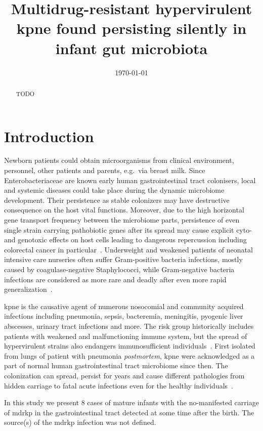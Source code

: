 \documentclass[12pt,a4paper]{article}
\title{Multidrug-resistant hypervirulent \Gls{kpne} found persisting silently in infant gut microbiota}
\date{\today}
\begin{document}
\maketitle
\glsresetall

\begin{abstract}
TODO
\end{abstract}

\section{Introduction}\label{sec:intro}
Newborn patients could obtain microorganisms from clinical environment, personnel, other patients and parents,
e.g.\ via breast milk.
Since Enterobacteriaceae are known early human gastrointestinal tract colonisers, local and systemic diseases could take
place during the dynamic microbiome development.
Their persistence as stable colonizers may have destructive consequence on the host vital functions.
Moreover, due to the high horizontal gene transport frequency between the microbiome parts, persistence of even single
strain carrying pathobiotic genes after its spread may cause explicit cyto- and genotoxic effects on host cells
leading to dangerous repercussion including colorectal cancer in particular~\cite{Pope2019}.
Underweight and weakened patients of neonatal intensive care nurseries often suffer Gram-positive bacteria infections,
mostly caused by coagulase-negative Staphylococci, while Gram-negative bacteria infections are considered as more rare
and deadly after even more rapid generalization~\cite{Dorota2017}.

\gls{kpne} is the causative agent of numerous nosocomial and community acquired infections including
pneumonia, sepsis, bacteremia, meningitis, pyogenic liver abscesses, urinary tract infections and more.
The risk group historically includes patients with weakened and malfunctioning immune system, but the spread of
hypervirulent strains also endangers immunosufficient individuals~\cite{Shankar2018}.
First isolated from lungs of patient with pneumonia \textit{postmortem}, \gls{kpne} were acknowledged as a part of
normal human gastrointestinal tract microbiome since then.
The colonization can spread, persist for years and cause different pathologies from hidden carriage to
fatal acute infections even for the healthy individuals~\cite{Martin2018}.

In this study we present 8 cases of mature infants with the no-manifested carriage of
\gls{mdrkp} in the gastrointestinal tract detected at some time after the birth.
The source(s) of the \gls{mdrkp} infection was not defined.
\end{document}
